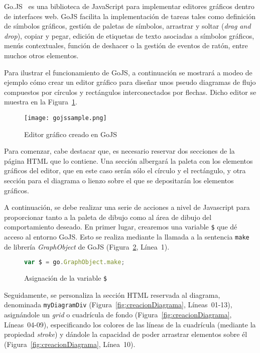 Go.JS~\cite{gojs} es una biblioteca de JavaScript para implementar editores gráficos dentro de interfaces web. GoJS facilita la implementación de tareas tales como definición de símbolos gráficos, gestión de paletas de símbolos, arrastrar y soltar (\emph{drag and drop}), copiar y pegar, edición de etiquetas de texto asociadas a símbolos gráficos, menús contextuales, función de deshacer o la gestión de eventos de ratón, entre muchos otros elementos.

Para ilustrar el funcionamiento de GoJS, a continuación se mostrará a modeo de ejemplo cómo crear un editor gráfico para diseñar unos pseudo diagramas de flujo compuestos por círculos y rectángulos interconectados por flechas. Dicho editor se muestra en la Figura~\ref{fig:gojssample}.

\begin{figure}[!tb]
	\centering
	\texttt{[image: gojssample.png]}
	\caption{Editor gráfico creado en GoJS}
    \label{fig:gojssample}
\end{figure}

Para comenzar, cabe destacar que, es necesario reservar dos secciones de la página HTML que lo contiene. Una sección albergará la paleta con los elementos gráficos del editor, que en este caso serán sólo el círculo y el rectángulo, y otra sección para el diagrama o lienzo sobre el que se depositarán los elementos gráficos.

A continuación, se debe realizar una serie de acciones a nivel de Javascript para proporcionar tanto a la paleta de dibujo como al área de dibujo del comportamiento deseado. En primer lugar, crearemos una variable \texttt{\$} que dé acceso al entorno GoJS. Esto se realiza mediante la llamada a la sentencia \texttt{make} de librería \emph{GraphObject} de GoJS (Figura~\ref{fig:asignacionDollar}, Línea~1).

\begin{figure}[!tb]
	\centering
	\begin{lstlisting}[language=JavaScript]
	var $ = go.GraphObject.make;
	\end{lstlisting}
	\caption{Asignación de la variable \texttt{\$}}
	\label{fig:asignacionDollar}
\end{figure}

Seguidamente, se personaliza la sección HTML reservada al diagrama, denominada \texttt{myDiagramDiv} (Figura~\ref{fig:creacionDiagrama}, Líneas~01-13), asignándole un \emph{grid} o cuadrícula de fondo (Figura~\ref{fig:creacionDiagrama}, Líneas~04-09), especificando los colores de las líneas de la cuadrícula (mediante la propiedad \emph{stroke}) y dándole la capacidad de poder arrastrar elementos sobre él (Figura~\ref{fig:creacionDiagrama}, Línea~10).

